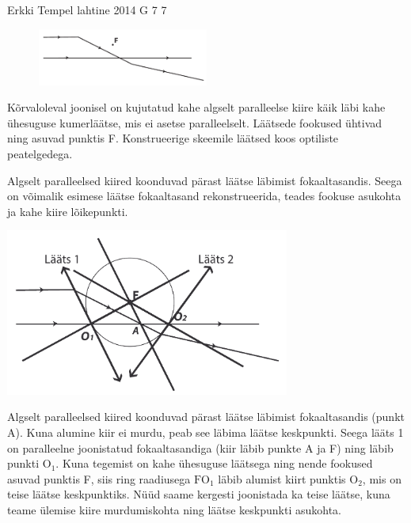 {Erkki Tempel} %
{lahtine} %
{2014} %
{G 7} %
{7} %
{
\ifStatement
\begin{figure}
  \includegraphics[width=0.5\textwidth]{2014-lahg-07-optilineskeemjoonis}
\end{figure}
Kõrvaloleval joonisel on kujutatud kahe algselt paralleelse kiire käik läbi kahe ühesuguse kumerläätse, mis ei asetse paralleelselt. Läätsede fookused ühtivad ning asuvad punktis F. Konstrueerige skeemile läätsed koos optiliste peatelgedega.
\fi


\ifHint
Algselt paralleelsed kiired koonduvad pärast läätse läbimist fokaaltasandis. Seega on võimalik esimese läätse fokaaltasand rekonstrueerida, teades fookuse asukohta ja kahe kiire lõikepunkti.
\fi


\ifSolution
\begin{center}
\includegraphics[width=0.7\textwidth]{2014-lahg-07-optilineskeemlahendus}
\end{center}
Algselt paralleelsed kiired koonduvad pärast läätse läbimist fokaaltasandis (punkt A). Kuna alumine kiir ei murdu, peab see läbima läätse keskpunkti. Seega lääts 1 on paralleelne joonistatud fokaaltasandiga (kiir läbib punkte A ja F) ning läbib punkti $\text{O}_1$. Kuna tegemist on kahe ühesuguse läätsega ning nende fookused asuvad punktis F, siis ring raadiusega $\text{FO}_1$ läbib alumist kiirt punktis $\text{O}_2$, mis on teise läätse keskpunktiks. Nüüd saame kergesti joonistada ka teise läätse, kuna teame ülemise kiire murdumiskohta ning läätse keskpunkti asukohta.
\fi


}
